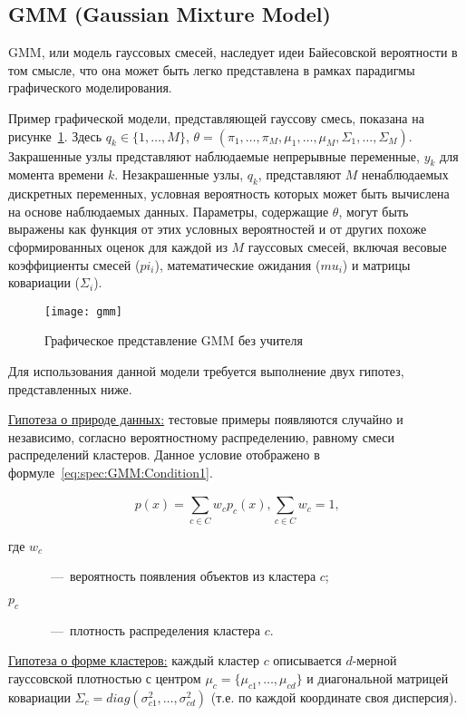 \subsection{GMM (Gaussian Mixture Model)}
GMM, или модель гауссовых смесей, наследует идеи Байесовской вероятности в том смысле, что она может быть легко представлена в рамках парадигмы графического моделирования.

Пример графической модели, представляющей гауссову смесь, показана на рисунке~\ref{fig:spec:GmmRepresentation}. Здесь $q_k\in \{1,\dots,M\}$, $\theta = (\pi_1,\dots,\pi_M,\mu_1,\dots,\mu_M,\Sigma_1,\dots,\Sigma_M)$. Закрашенные узлы представляют наблюдаемые непрерывные переменные, $y_k$ для момента времени $k$. Незакрашенные узлы, $q_k$, представляют $M$ ненаблюдаемых дискретных переменных, условная вероятность которых может быть вычислена на основе наблюдаемых данных. Параметры, содержащие $\theta$, могут быть выражены как функция от этих условных вероятностей и от других похоже сформированных оценок для каждой из $M$ гауссовых смесей, включая весовые коэффициенты смесей ($pi_i$), математические ожидания ($mu_i$) и матрицы ковариации ($\Sigma_i$).

\begin{figure}[h]
\texttt{[image: gmm]}
\caption{Графическое представление GMM без учителя}
\label{fig:spec:GmmRepresentation}
\end{figure}

Для использования данной модели требуется выполнение двух гипотез, представленных ниже.

\uline{Гипотеза о природе данных:} тестовые примеры появляются случайно и независимо, согласно вероятностному распределению, равному смеси распределений кластеров. Данное условие отображено в формуле~\eqref{eq:spec:GMM:Condition1}.

\begin{equation} \label{eq:spec:GMM:Condition1}
p(x) = \sum_{c\in C}^{} w_c p_c(x), \sum_{c\in C}^{} w_c = 1\text{,}
\end{equation}
\begin{description}
	\item[где $w_c$]~---~вероятность появления объектов из кластера $c$;
	\item[$p_c$]~---~плотность распределения кластера $c$.
\end{description}

\uline{Гипотеза о форме кластеров:} каждый кластер $c$ описывается $d$-мерной гауссовской плотностью с центром $\mu_c = \{\mu_{c1},\dots,\mu_{cd}\}$ и диагональной матрицей ковариации $\Sigma_c = diag(\sigma^2_{c1},\dots,\sigma^2_{cd})$ (т.е. по каждой координате своя дисперсия).

